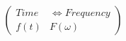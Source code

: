\documentclass[preview]{standalone}
\begin{document}
\begin{align*}
\left( \begin{array}{cl} Time & \Longleftrightarrow Frequency \\ f(t) & F(\omega) \end{array} \right)
\end{align*}
\end{document}
